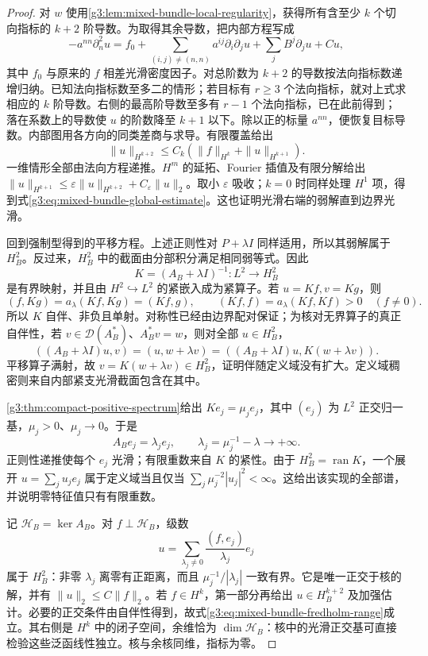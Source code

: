 \begin{proof}
	对 \(w\) 使用\cref{g3:lem:mixed-bundle-local-regularity}，获得所有含至少 \(k\) 个切向指标的 \(k+2\) 阶导数。为取得其余导数，把内部方程写成
	\[
		-a^{nn}\partial_n^2u
		=f_0+\sum_{(i,j)\ne(n,n)}a^{ij}\partial_i\partial_ju
		+\sum_j B^j\partial_ju+Cu,
	\]
	其中 \(f_0\) 与原来的 \(f\) 相差光滑密度因子。对总阶数为 \(k+2\) 的导数按法向指标数递增归纳。已知法向指标数至多二的情形；若目标有 \(r\ge3\) 个法向指标，就对上式求相应的 \(k\) 阶导数。右侧的最高阶导数至多有 \(r-1\) 个法向指标，已在此前得到；落在系数上的导数使 \(u\) 的阶数降至 \(k+1\) 以下。除以正的标量 \(a^{nn}\)，便恢复目标导数。内部图用各方向的同类差商与求导。有限覆盖给出
	\[
		\|u\|_{H^{k+2}}\le C_k(\|f\|_{H^k}+\|u\|_{H^{k+1}}).
	\]
	一维情形全部由法向方程递推。\(H^m\) 的延拓、Fourier 插值及有限分解给出
	\(\|u\|_{H^{k+1}}\le\varepsilon\|u\|_{H^{k+2}}+C_\varepsilon\|u\|_2\)。取小 \(\varepsilon\) 吸收；\(k=0\) 时同样处理 \(H^1\) 项，得到式\eqref{g3:eq:mixed-bundle-global-estimate}。这也证明光滑右端的弱解直到边界光滑。

	回到强制型得到的平移方程。上述正则性对 \(P+\lambda I\) 同样适用，所以其弱解属于 \(H_B^2\)。反过来，\(H_B^2\) 中的截面由分部积分满足相同弱等式。因此
	\[
		K=(A_B+\lambda I)^{-1}:L^2\longrightarrow H_B^2
	\]
	是有界映射，并且由 \(H^2\hookrightarrow L^2\) 的紧嵌入成为紧算子。若 \(u=Kf,v=Kg\)，则
	\[
		(f,Kg)=a_\lambda(Kf,Kg)=(Kf,g),\qquad
		(Kf,f)=a_\lambda(Kf,Kf)>0\quad(f\ne0).
	\]
	所以 \(K\) 自伴、非负且单射。对称性已经由边界配对保证；为核对无界算子的真正自伴性，若 \(v\in\mathcal D(A_B^*)\)、\(A_B^*v=w\)，则对全部 \(u\in H_B^2\)，
	\[
		((A_B+\lambda I)u,v)=(u,w+\lambda v)
		=((A_B+\lambda I)u,K(w+\lambda v)).
	\]
	平移算子满射，故 \(v=K(w+\lambda v)\in H_B^2\)，证明伴随定义域没有扩大。定义域稠密则来自内部紧支光滑截面包含在其中。

	\cref{g3:thm:compact-positive-spectrum}给出 \(Ke_j=\mu_je_j\)，其中 \((e_j)\) 为 \(L^2\) 正交归一基，\(\mu_j>0\)、\(\mu_j\to0\)。于是
	\[
		A_Be_j=\lambda_je_j,\qquad
		\lambda_j=\mu_j^{-1}-\lambda\longrightarrow+\infty.
	\]
	正则性递推使每个 \(e_j\) 光滑；有限重数来自 \(K\) 的紧性。由于 \(H_B^2=\operatorname{ran}K\)，一个展开 \(u=\sum_j u_je_j\) 属于定义域当且仅当
	\(\sum_j\mu_j^{-2}|u_j|^2<\infty\)。这给出该实现的全部谱，并说明零特征值只有有限重数。

	记 \(\mathcal H_B=\ker A_B\)。对 \(f\perp\mathcal H_B\)，级数
	\[
		u=\sum_{\lambda_j\ne0}\frac{(f,e_j)}{\lambda_j}e_j
	\]
	属于 \(H_B^2\)：非零 \(\lambda_j\) 离零有正距离，而且 \(\mu_j^{-1}/|\lambda_j|\) 一致有界。它是唯一正交于核的解，并有 \(\|u\|_2\le C\|f\|_2\)。若 \(f\in H^k\)，第一部分再给出 \(u\in H_B^{k+2}\) 及加强估计。必要的正交条件由自伴性得到，故式\eqref{g3:eq:mixed-bundle-fredholm-range}成立。其右侧是 \(H^k\) 中的闭子空间，余维恰为 \(\dim\mathcal H_B\)：核中的光滑正交基可直接检验这些泛函线性独立。核与余核同维，指标为零。
\end{proof}

